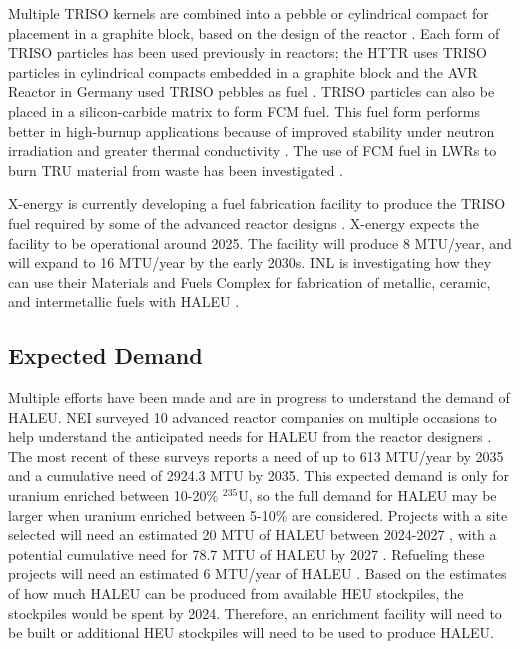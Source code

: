 Multiple \gls{TRISO} kernels are combined into a pebble or 
cylindrical compact for placement in a graphite block, based on the 
design of the reactor \cite{demkowicz_coated_2019}. Each form of 
\gls{TRISO} particles has been used previously in reactors; the \gls{HTTR}
uses 
\gls{TRISO} particles in cylindrical compacts embedded in a graphite block 
\cite{shiozawa_overview_2004} and the AVR Reactor in Germany used 
\gls{TRISO} pebbles as fuel \cite{gottaut_results_1990}.
\gls{TRISO} particles can also be placed in a silicon-carbide matrix 
to form \gls{FCM} fuel. This fuel form performs better in high-burnup 
applications because of improved stability under neutron irradiation and 
greater thermal conductivity \cite{snead_fully_2011}. The use of 
\gls{FCM} fuel in \glspl{LWR} to burn \gls{TRU} material from waste 
has been investigated \cite{snead_fully_2011,venneri_fully_2011}. 

X-energy is currently developing a fuel fabrication facility to 
produce the \gls{TRISO} fuel required by some of the advanced 
reactor designs \cite{x-energy_triso-x_2022}. X-energy expects the 
facility to be operational around 2025. The facility will 
produce 8 MTU/year, and will expand to 16 MTU/year 
by the early 2030s. \gls{INL} is investigating 
how they can use their Materials and Fuels Complex for 
fabrication of metallic, ceramic, and intermetallic fuels with 
\gls{HALEU} \cite{crawford_fuel_2019}. 

\subsection{Expected Demand}
Multiple efforts have been made and are in progress to understand the 
demand of \gls{HALEU}. \gls{NEI} surveyed 10 advanced reactor 
companies on multiple occasions to help understand the anticipated needs
for \gls{HALEU} from the reactor designers 
\cite{korsnick_need_2018,korsnick_updated_2020,korsnick_updated_2021}. 
The most recent of these surveys \cite{korsnick_updated_2021} reports 
a need of up to 613 MTU/year by 2035 and a cumulative need of 2924.3 MTU 
by 2035. This expected demand is only for uranium enriched between 10-20\%
$^{235}$U, so the full demand for \gls{HALEU} may be larger when uranium 
enriched between 5-10\% are considered. Projects with a site selected 
will need an estimated 20 MTU of \gls{HALEU} between 2024-2027 
\cite{nuclear_energy_institute_establishing_2022}, with a potential cumulative 
need for 78.7 MTU of \gls{HALEU} by 2027 \cite{korsnick_updated_2021}. 
Refueling these projects will need an estimated 6 MTU/year of 
\gls{HALEU} \cite{nuclear_energy_institute_establishing_2022}. Based 
on the estimates of how much \gls{HALEU} can be produced from available 
\gls{HEU} stockpiles, the stockpiles would be spent by 2024. Therefore, 
an enrichment facility will need to be built or additional \gls{HEU} 
stockpiles will need to be used to produce \gls{HALEU}.

